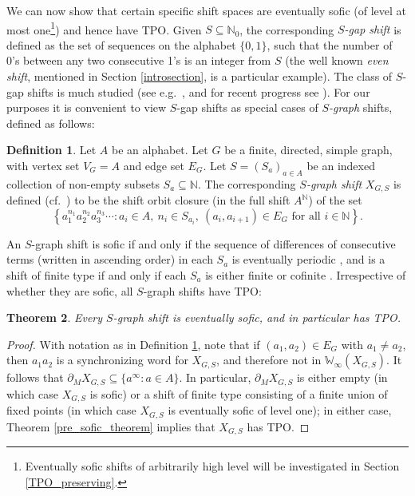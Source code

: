 \documentclass[reqno,11pt]{amsart}
\newtheorem{thm}{Theorem}[section]
\theoremstyle{definition}
\newtheorem{defn}[thm]{Definition}
\theoremstyle{remark}
\theoremstyle{remark}
\def \N {\mathbb N}
\def\w{\mathbb{W}}
\numberwithin{equation}{section}
\begin{document}
We can now show that certain specific shift spaces are eventually sofic (of level at most one\footnote{Eventually sofic shifts of
arbitrarily  high level will be investigated in Section \ref{TPO_preserving}.}) and hence have TPO.
Given $S\subseteq\N_0$, the corresponding \emph{$S$-gap shift} 
is defined as the set of sequences on the alphabet $\{0,1\}$, such that
the number of 0's between any two consecutive 1's is an integer from $S$
(the well known \emph{even shift}, mentioned in Section \ref{introsection}, is a particular example).
The class of $S$-gap shifts is much studied
(see e.g.~\cite[\S 1.2]{LM95}, and for recent progress see \cite{climenhaga, climenhagathompson, climenhagathompsonyamamoto}).
For our purposes it is convenient to view $S$-gap shifts as special cases of
\emph{$S$-graph} shifts, defined as follows:

\begin{defn}\label{sgraph_defn}
Let $A$ be an alphabet.
Let $G$ be a finite, directed, simple graph, with vertex set $V_G=A$ and edge set $E_G$.
Let $S =(S_a)_{a\in A}$ be an indexed collection of non-empty subsets $S_a\subseteq \N$. 
The corresponding \emph{$S$-graph shift} 
$X_{G,S}$ is defined (cf.~\cite{Di22}) to be the shift orbit closure (in the full shift $A^\N$) of the set
$$
\left\{ a_1^{n_1}a_2^{n_2}a_3^{n_3}\cdots : a_i\in A, \ n_i\in S_{a_i},\ (a_i,a_{i+1})\in E_G \text{ for all }i\in\N\right\}.
$$
\end{defn}

An $S$-graph shift is sofic if and only if the sequence of differences of consecutive terms (written in ascending order) in each $S_a$ is eventually periodic \cite[Prop.~3.2]{Di22},
and is a shift of finite type if and only if each $S_a$ is either finite or cofinite \cite[Prop.~3.1]{Di22}.
Irrespective of whether they are sofic, all $S$-graph shifts have TPO:

\begin{thm}\label{sgraphtpotheorem}
Every $S$-graph shift
is eventually sofic, 
and in particular has  
TPO.
\end{thm}
\begin{proof}
With notation as in Definition \ref{sgraph_defn}, note that
if $(a_1,a_2)\in E_{G}$ with $a_1\neq a_2$, then $a_1 a_2$ is a synchronizing word for $X_{G,S}$,
and therefore not in $\w_\infty(X_{G,S})$.
It follows that $\partial_M X_{G,S} \subseteq \{a^\infty: a\in A\}$.
In particular, $\partial_M X_{G,S}$ is either empty (in which case $X_{G,S}$ is sofic) or a shift of finite type consisting of a finite union of fixed points (in which case $X_{G,S}$ is eventually sofic of level one); in either case, Theorem \ref{pre_sofic_theorem}
implies that $X_{G,S}$ has TPO.
\end{proof}
\end{document}
